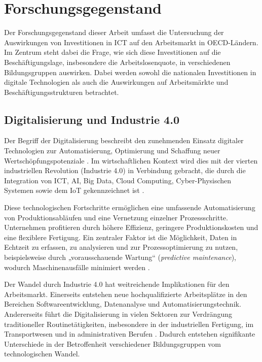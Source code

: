
\section{Forschungsgegenstand}

Der Forschungsgegenstand dieser Arbeit umfasst die Untersuchung der Auswirkungen von 
Investitionen in \ac{ICT} auf den Arbeitsmarkt in \ac{OECD}-Ländern. Im Zentrum steht 
dabei die Frage, wie sich diese Investitionen auf die Beschäftigungslage, insbesondere die 
Arbeitslosenquote, in verschiedenen Bildungsgruppen auswirken. Dabei werden sowohl die 
nationalen Investitionen in digitale Technologien als auch die Auswirkungen auf 
Arbeitsmärkte und Beschäftigungsstrukturen betrachtet.


\subsection{Digitalisierung und Industrie 4.0}

Der Begriff der Digitalisierung beschreibt den zunehmenden Einsatz digitaler Technologien 
zur Automatisierung, Optimierung und Schaffung neuer Wertschöpfungspotenziale 
\parencite[S. 6]{brennen2016theinternational}. Im wirtschaftlichen Kontext wird dies mit 
der vierten industriellen Revolution (Industrie 4.0) in Verbindung gebracht, die durch die 
Integration von \ac{ICT}, \ac{AI}, Big Data, Cloud Computing, Cyber-Physischen Systemen 
sowie dem \ac{IoT} gekennzeichnet ist \parencite[S. 22]{kagermann2013recommendations}. 

Diese technologischen Fortschritte ermöglichen eine umfassende Automatisierung von 
Produktionsabläufen und eine Vernetzung einzelner Prozessschritte. Unternehmen profitieren 
durch höhere Effizienz, geringere Produktionskosten und eine flexiblere Fertigung. Ein 
zentraler Faktor ist die Möglichkeit, Daten in Echtzeit zu erfassen, zu analysieren und 
zur Prozessoptimierung zu nutzen, beispielsweise durch „vorausschauende Wartung“ 
(\textit{predictive maintenance}), wodurch Maschinenausfälle minimiert werden 
\parencite[S. 85]{bartodziej2016theconcept}. 

Der Wandel durch Industrie 4.0 hat weitreichende Implikationen für den Arbeitsmarkt. 
Einerseits entstehen neue hochqualifizierte Arbeitsplätze in den Bereichen Softwareentwicklung, 
Datenanalyse und Automatisierungstechnik. Andererseits führt die Digitalisierung in vielen 
Sektoren zur Verdrängung traditioneller Routinetätigkeiten, insbesondere in der industriellen 
Fertigung, im Transportwesen und in administrativen Berufen \parencite[S. 40]{frey2013thefuture}. 
Dadurch entstehen signifikante Unterschiede in der Betroffenheit verschiedener Bildungsgruppen 
vom technologischen Wandel.

